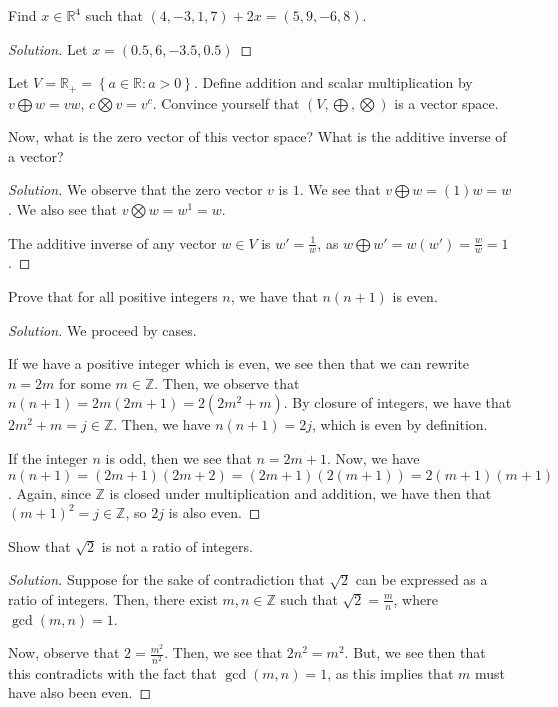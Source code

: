 \documentclass[openany]{book}
\newenvironment{solution}{\begin{proof}[Solution]}{\end{proof}}
\newcommand{\RR}{\mathbb{R}}
\newcommand{\ZZ}{\mathbb{Z}}
\begin{document}
	\begin{hw}
		Find $x \in \RR^{4}$ such that $\left( 4, -3, 1, 7 \right) + 2x = (5, 9, -6, 8)$. 
	\end{hw}
	\begin{solution}
		Let $x = (0.5, 6, -3.5, 0.5)$
	\end{solution}
	
	\begin{hw}
		Let $V = \RR_{+} = \left\{  a \in \RR : a > 0\right\}$. Define addition and scalar multiplication by $v \bigoplus w = vw$, $c \bigotimes v = v^{c}$. Convince yourself that $(V, \bigoplus, \bigotimes)$ is a vector space.
		
		Now, what is the zero vector of this vector space? What is the additive inverse of a vector?
	\end{hw}
	\begin{solution}
		We observe that the zero vector $v$ is $1$. We see that $v \bigoplus w = (1)w = w$. We also see that $v \bigotimes w = w^{1} = w$.
		
		The additive inverse of any vector $w \in V$ is $w' = \frac{1}{w}$, as $w \bigoplus w' = w(w') = \frac{w}{w} = 1$.
	\end{solution}
	
	\begin{hw}
		Prove that for all positive integers $n$, we have that $n(n+1)$ is even.
	\end{hw}
	\begin{solution}
		We proceed by cases.
		
		If we have a positive integer which is even, we see then that we can rewrite $n = 2m$ for some $m \in \ZZ$. Then, we observe that $n(n+1) = 2m(2m + 1) = 2(2m^{2} + m)$. By closure of integers, we have that $2m^{2} + m = j \in \ZZ$. Then, we have $n(n+1) = 2j$, which is even by definition.
		
		If the integer $n$ is odd, then we see that $n = 2m+1$. Now, we have $n(n+1) = (2m+1)(2m+2) = (2m+1)(2(m+1)) = 2(m+1)(m+1)$. Again, since $\ZZ$ is closed under multiplication and addition, we have then that $(m+1)^{2} = j \in \ZZ$, so $2j$ is also even.
	\end{solution}
	
	\begin{hw}
		Show that $\sqrt{2}$ is not a ratio of integers.
	\end{hw}
	\begin{solution}
		Suppose for the sake of contradiction that $\sqrt{2}$ can be expressed as a ratio of integers. Then, there exist $m, n \in \ZZ$ such that $\sqrt{2} = \frac{m}{n}$, where $\gcd(m,n) = 1$.
		
		Now, observe that $2 = \frac{m^{2}}{n^{2}}$. Then, we see that $2n^{2} = m^{2}$. But, we see then that this contradicts with the fact that $\gcd(m,n) = 1$, as this implies that $m$ must have also been even.
	\end{solution}
	
\end{document}
